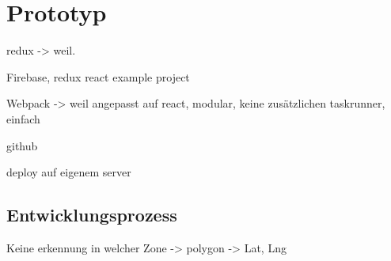 \chapter{Prototyp}
\label{sec:prototyp}

redux -> weil.

Firebase, redux react example project

Webpack -> weil angepasst auf react, modular, keine zusätzlichen taskrunner, einfach

github

deploy auf eigenem server

\section{Entwicklungsprozess}

Keine erkennung in welcher Zone -> polygon -> Lat, Lng


